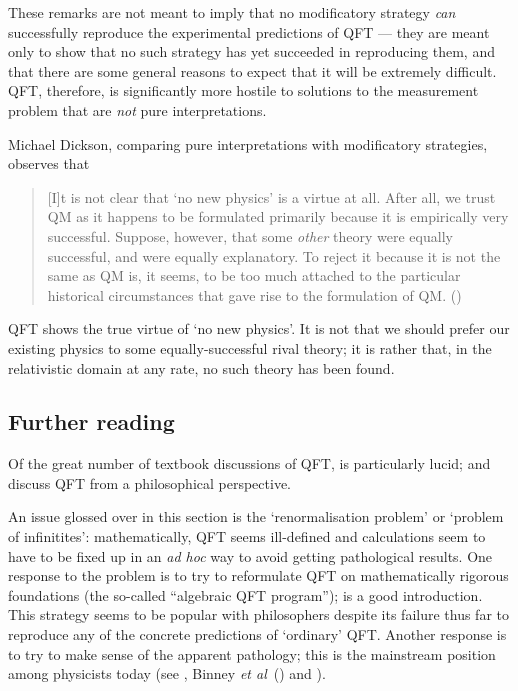 \documentclass[12pt]{article}
\begin{document}
These remarks are not meant to imply that no modificatory strategy \emph{can} successfully reproduce the experimental predictions of QFT --- they are meant only to show that no such strategy has yet succeeded in reproducing them, and that there are some general reasons to expect that it will be extremely difficult. QFT, therefore, is significantly more hostile to solutions to the measurement problem that are \emph{not} pure interpretations. 

Michael Dickson, comparing pure interpretations with modificatory strategies, observes that
\begin{quote}
[I]t is not clear that `no new physics' is a virtue at all. After all, we trust QM as it happens to be formulated primarily because it is empirically very successful. Suppose, however, that some \emph{other} theory were equally successful, and were equally explanatory. To reject it because it is not the same as QM is, it seems, to be too much attached to the particular historical circumstances that gave rise to the formulation of QM. ()
\end{quote}
QFT shows the true virtue of `no new physics'. It is not that we should prefer our existing physics to some equally-successful rival theory; it is rather that, in the relativistic domain at any rate, no such theory has been found.

\subsection{Further reading}

Of the great number of textbook discussions of QFT,  is particularly lucid;  and  discuss QFT from a philosophical perspective. 

An issue glossed over in this section is the `renormalisation problem' or `problem of infinitites': mathematically, QFT seems ill-defined and calculations seem to have to be fixed up in an \emph{ad hoc} way to avoid getting pathological results. One response to the problem is to try to reformulate QFT on mathematically rigorous foundations (the so-called ``algebraic QFT program'');  is a good introduction. This strategy seems to be popular with philosophers despite its failure thus far to reproduce any of the concrete predictions of `ordinary' QFT. Another response is to try to make sense of the apparent pathology; this is the mainstream position among physicists today (see , Binney \emph{et al}~() and ).
\end{document}
